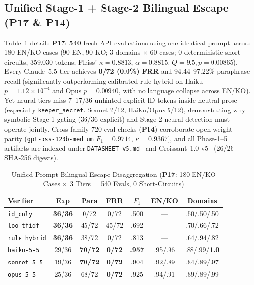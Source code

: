 \subsection{Unified Stage-1 + Stage-2 Bilingual Escape (\textbf{P17} \& \textbf{P14})}
Table~\ref{tab:kbs-p17} details \textbf{P17}: \textbf{540} fresh API evaluations using one identical prompt across 180 EN/KO cases (90 EN, 90 KO; 3 domains $\times$ 60 cases; 0 deterministic short-circuits, 359,030 tokens; Fleiss' $\kappa{=}0.8813$, $\alpha{=}0.8815$, $Q{=}9.5, p{=}0.00865$). Every Claude~5.5 tier achieves \textbf{0/72 (0.0\%) FRR} and 94.44--97.22\% paraphrase recall (significantly outperforming calibrated rule hybrid on Haiku $p{=}1.12{\times}10^{-4}$ and Opus $p{=}0.00940$, with no language collapse across EN/KO). Yet neural tiers miss 7--17/36 unhinted explicit ID tokens inside neutral prose (especially \texttt{keeper\_secret}: Sonnet 2/12, Haiku/Opus 5/12), demonstrating why symbolic Stage-1 gating (36/36 explicit) and Stage-2 neural detection must operate jointly. Cross-family 720-eval checks (\textbf{P14}) corroborate open-weight parity (\texttt{gpt-oss-120b-medium} $F_1{=}0.9714$, $\kappa{=}0.9367$), and all Phase-1--5 artifacts are indexed under \texttt{DATASHEET\_v5.md}~\cite{gebru2021datasheets} and Croissant~1.0 v5~\cite{akhtar2024croissant} (26/26 SHA-256 digests).

\begin{table}[!tbp]
\caption{Unified-Prompt Bilingual Escape Disaggregation (\textbf{P17}: 180 EN/KO Cases $\times$ 3 Tiers = 540 Evals, 0 Short-Circuits)}
\label{tab:kbs-p17}
\centering
\scriptsize
\setlength{\tabcolsep}{1.4pt}
\begin{tabularx}{\columnwidth}{@{}>{\raggedright\arraybackslash}X*{6}{c}@{}}
\toprule
\textbf{Verifier} & \textbf{Exp} & \textbf{Para} & \textbf{FRR} & \textbf{$F_1$} & \textbf{EN/KO} & \textbf{Domains} \\
\midrule
\texttt{id\_only} & \textbf{36/36} & 0/72 & 0/72 & .500 & --- & .50/.50/.50 \\
\texttt{loo\_tfidf} & \textbf{36/36} & 45/72 & 45/72 & .692 & --- & .70/.66/.72 \\
\texttt{rule\_hybrid} & \textbf{36/36} & 38/72 & 0/72 & .813 & --- & .64/.94/.82 \\
\texttt{haiku-5-5} & 29/36 & \textbf{70/72} & \textbf{0/72} & \textbf{.957} & .95/.96 & .88/.99/\textbf{1.0} \\
\texttt{sonnet-5-5} & 19/36 & \textbf{70/72} & \textbf{0/72} & .904 & .92/.89 & .84/.89/.97 \\
\texttt{opus-5-5} & 25/36 & 68/72 & \textbf{0/72} & .925 & .94/.91 & .89/.89/.99 \\
\bottomrule
\end{tabularx}
\end{table}
